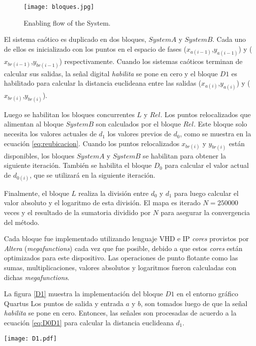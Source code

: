 \begin{figure}
	\centering
	\texttt{[image: bloques.jpg]}\\
	\caption{Enabling flow of the System.}\label{bloques}
\end{figure}

El sistema caótico es duplicado en dos bloques, $System A$ y $System B$.
Cada uno de ellos es inicializado con los puntos en el espacio de fases	($x_{a(i-1)}$,$y_{a(i-1)}$) y ($x_{br(i-1)}$,$y_{br(i-1)}$) respectivamente.
Cuando los sistemas caóticos terminan de calcular sus salidas, la señal digital \textit{habilita} se pone en cero y el bloque $D1$ es habilitado para calcular la distancia euclideana entre las salidas ($x_{a(i)}$,$y_{a(i)}$) y ($x_{br(i)}$,$y_{br(i)}$).

Luego se habilitan los bloques concurrentes $L$ y $Rel$.
Los puntos relocalizados que alimentan al bloque $System B$ son calculados por el bloque $Rel$.
Este bloque solo necesita los valores actuales de $d_1$ los valores previos de $d_0$, como se muestra en la ecuación \ref{eq:reubicacion}.
Cuando los puntos relocalizados $x_{br(i)}$ y $y_{br(i)}$ están disponibles, los bloques $System A$ y $System B$ se habilitan para obtener la siguiente iteración.
También se habilita el bloque $D_0$ para calcular el valor actual de $d_{0(i)}$, que se utilizará en la siguiente iteración.

Finalmente, el bloque $L$ realiza la división entre $d_0$ y $d_1$ para luego calcular el valor absoluto y el logaritmo de esta división.
El mapa es iterado $N=250000$ veces y el resultado de la sumatoria dividido por $N$ para asegurar la convergencia del método.

Cada bloque fue implementado utilizando lenguaje VHD e IP \textit{cores} provistos por \textit{Altera} (\textit{megafunctions}) cada vez que fue posible, debido a que estos \textit{cores} están optimizados para este dispositivo.
Las operaciones de punto flotante como las sumas, multiplicaciones, valores absolutos y logaritmos fueron calculadas con dichas \textit{megafunctions}.

La figura \ref{D1} muestra la implementación del bloque $D1$ en el entorno gráfico Quartus
Los puntos de salida y entrada $a$ y $b$, son tomados luego de que la señal \textit{habilita} se pone en cero.
Entonces, las señales son procesadas de acuerdo a la ecuación \ref{eq:D0D1} para calcular la distancia euclideana $d_1$.

\begin{figure*}
	\centering
	\texttt{[image: D1.pdf]}\\
	\caption{$D_1$ Block.}\label{D1}
\end{figure*}

